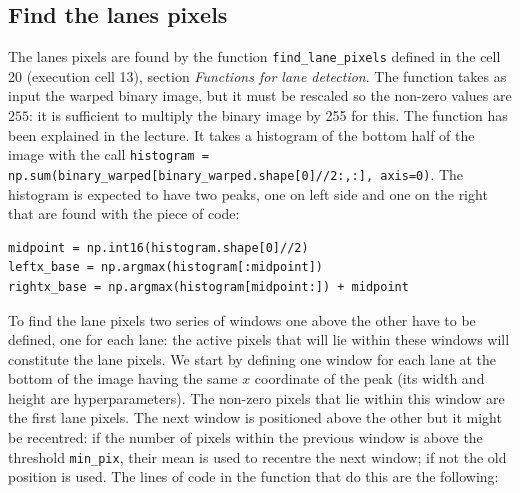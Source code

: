 \documentclass{article}
\let\cd\lstinline
\begin{document}
\subsection{Find the lanes pixels}
The lanes pixels are found by the function \cd+find_lane_pixels+ defined in the cell 20 (execution cell 13), section \textit{Functions for lane detection}. The function takes as input the warped binary image, but it must be rescaled so the non-zero values are $255$: it is sufficient to multiply the binary image by 255 for this. The function has been explained in the lecture. It takes a histogram of the bottom half of the image with the call \cd+histogram = np.sum(binary_warped[binary_warped.shape[0]//2:,:], axis=0)+. The histogram is expected to have two peaks, one on left side and one on the right that are found with the piece of code:
\begin{lstlisting}
midpoint = np.int16(histogram.shape[0]//2)
leftx_base = np.argmax(histogram[:midpoint])
rightx_base = np.argmax(histogram[midpoint:]) + midpoint
\end{lstlisting} 
To find the lane pixels two series of windows one above the other have to be defined, one for each lane: the active pixels that will lie within these windows will constitute the lane pixels. We start by defining one window for each lane at the bottom of the image having the same $x$ coordinate of the peak (its width and height are hyperparameters). The non-zero pixels that lie within this window are the first lane pixels. The next window is positioned above the other but it might be recentred: if the number of pixels within the previous window is above the threshold \cd+min_pix+, their mean is used to recentre the next window; if not the old position is used. The lines of code in the function that do this are the following:
\end{document}
